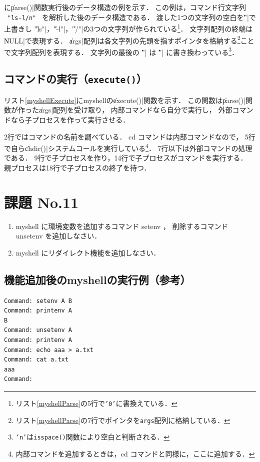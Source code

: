 に\|parse()|関数実行後のデータ構造の例を示す．
この例は，コマンド行文字列
~\texttt{"ls{\textvisiblespace}-l{\textvisiblespace}{\textvisiblespace}/{\bs}n"}~
を解析した後のデータ構造である．
渡した1つの文字列の空白を\|'\0'|で上書きし
\|"ls"|，\|"-l"|，\|"/"|の3つの文字列が作られている\footnote{
  リスト\ref{myshellParse}の5行で\texttt{'{\bs}0'}に書換えている．}．
文字列配列の終端は\|NULL|で表現する．
\|args|配列は各文字列の先頭を指すポインタを格納する\footnote{
  リスト\ref{myshellParse}の7行でポインタを\texttt{args}配列に格納している．
}ことで文字列配列を表現する．
文字列の最後の \|'\n'| は \|'\0'| に書き換わっている\footnote{
  \texttt{'{\bs}n'}は\texttt{isspace()}関数により空白と判断される．
}．

\subsection{コマンドの実行（\texttt{execute()}）}
リスト\ref{myshellExecute}にmyshellの\|execute()|関数を示す．
この関数は\|parse()|関数が作った\|args|配列を受け取り，
内部コマンドなら自分で実行し，
外部コマンドなら子プロセスを作って実行させる．




2行ではコマンドの名前を調べている．
cd コマンドは内部コマンドなので，
5行で自ら\|chdir()|システムコールを実行している\footnote{
  内部コマンドを追加するときは，cd コマンドと同様に，ここに追加する．}．
7行以下は外部コマンドの処理である．
9行で子プロセスを作り，14行で子プロセスがコマンドを実行する．
親プロセスは18行で子プロセスの終了を待つ．


\newpage
\section*{課題 No.11}

\begin{enumerate}
\item myshell に環境変数を追加するコマンド setenv ，
  削除するコマンド unsetenv を追加しなさい．
\item myshell にリダイレクト機能を追加しなさい．
\end{enumerate}

\subsection*{機能追加後のmyshellの実行例（参考）}
  \begin{lstlisting}[numbers=none]
Command: setenv A B
Command: printenv A
B
Command: unsetenv A
Command: printenv A
Command: echo aaa > a.txt
Command: cat a.txt
aaa
Command:
  \end{lstlisting}
